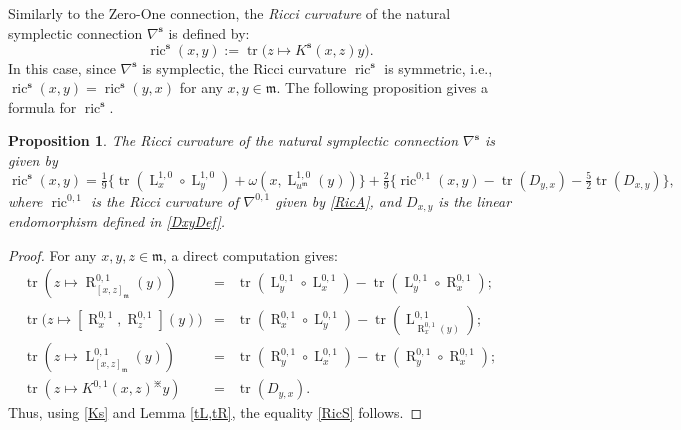 \documentclass[preprint,12pt,1p]{elsarticle}
\theoremstyle{plain}
\newtheorem{proposition}[theorem]{Proposition}
\theoremstyle{definition}
\newcommand{\ro}{\circ}
\newcommand{\n}{\nabla}
\newcommand{\nc}{\n^{0,1}}
\newcommand{\ns}{\n^\mathbf{s}}
\newcommand{\tr}{\operatorname{tr}}
\newcommand{\la}{\operatorname{L}^{0,1}}
\newcommand{\ra}{\operatorname{R}^{0,1}}
\newcommand{\lm}{\operatorname{L}^{1,0}}
\newcommand{\ric}{\operatorname{ric}}
\numberwithin{equation}{section}
\newcommand{\aj}{\divideontimes}
\newcommand{\Kc}{K^{0,1}}
\newcommand{\Ks}{K^\mathbf{s}}
\begin{document}
Similarly to the Zero-One connection, the \textit{Ricci curvature} of the natural symplectic connection $\ns$ is defined by:
\begin{equation*}
\ric^\mathbf{s}(x,y):=\tr\big(z\mapsto \Ks(x,z)y\big).
\end{equation*}
In this case, since $\ns$ is symplectic, the Ricci curvature $\ric^\mathbf{s}$ is symmetric, i.e., $\ric^\mathbf{s}(x,y)=\ric^\mathbf{s}(y,x)$ for any $x,y\in\mathfrak{m}$. The following proposition gives a formula for $\ric^\mathbf{s}$.

\begin{proposition}
The Ricci curvature of the natural symplectic connection $\ns$ is given by
\begin{equation}\label{RicS}
\ric^\mathbf{s}(x,y)=\tfrac{1}{9}\Big\{\tr\left(\lm_x\ro\lm_y\right)+\omega\left(x,\lm_{u^\mathfrak{m}}(y)\right)\Big\}+\tfrac{2}{9}\Big\{\ric^{0,1}(x,y)-\tr(D_{y,x})-\tfrac{5}{2}\tr(D_{x,y})\Big\},
\end{equation}
where $\ric^{0,1}$ is the Ricci curvature of $\nc$ given by \eqref{RicA}, and $D_{x,y}$ is the linear endomorphism defined in \eqref{DxyDef}.
\end{proposition}

\begin{proof}
For any $x,y,z\in\mathfrak{m}$, a direct computation gives: 
\begin{eqnarray*}
\tr\left(z\mapsto\ra_{[x,z]_\mathfrak{m}}(y)\right)&=&\tr(\la_y\ro\la_x)-\tr(\la_y\ro\ra_x);\\
\tr\big(z\mapsto\left[\ra_x,\ra_z\right](y)\big)&=&\tr(\ra_x\ro\la_y)-\tr(\la_{\ra_x(y)});\\
\tr\left(z\mapsto\la_{[x,z]_\mathfrak{m}}(y)\right)&=&\tr(\ra_y\ro\la_x)-\tr(\ra_y\ro\ra_x);\\
\tr\left(z\mapsto \Kc(x,z)^\aj y\right)&=&\tr(D_{y,x}).
\end{eqnarray*}
Thus, using \eqref{Ks} and Lemma \ref{tL,tR}, the equality \eqref{RicS} follows.
\end{proof}
\end{document}
